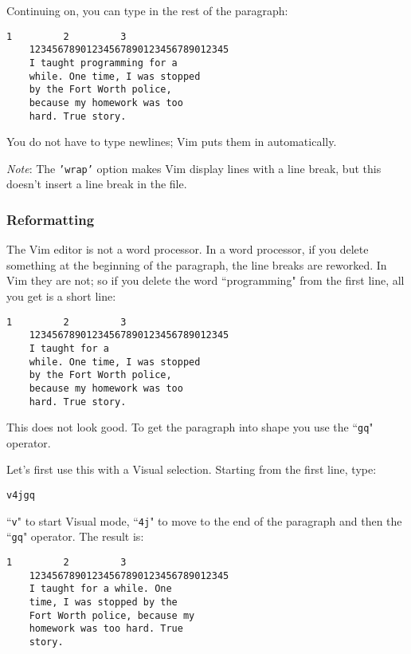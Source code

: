 Continuing on, you can type in the rest of the paragraph:

\begin{Verbatim}[samepage=true]
             1         2         3
    12345678901234567890123456789012345
    I taught programming for a
    while. One time, I was stopped
    by the Fort Worth police,
    because my homework was too
    hard. True story.
\end{Verbatim}

You do not have to type newlines; Vim puts them in automatically.

\emph{Note}: The \texttt{'wrap'} option makes Vim display lines with a line break, but this doesn't insert a line break in the file.
\subsubsection{Reformatting}
The Vim editor is not a word processor.
In a word processor, if you delete something at the beginning of the paragraph, the line breaks are reworked.
In Vim they are not; so if you delete the word ``programming" from the first line, all you get is a short line:

\begin{Verbatim}[samepage=true]
             1         2         3
    12345678901234567890123456789012345
    I taught for a
    while. One time, I was stopped
    by the Fort Worth police,
    because my homework was too
    hard. True story.
\end{Verbatim}

This does not look good.
To get the paragraph into shape you use the ``\texttt{gq}" operator.

Let's first use this with a Visual selection.
Starting from the first line, type:

\begin{Verbatim}[samepage=true]
 v4jgq
\end{Verbatim}

``\texttt{v}" to start Visual mode, ``\texttt{4j}" to move to the end of the paragraph and then the ``\texttt{gq}" operator.
The result is:

\begin{Verbatim}[samepage=true]
             1         2         3
    12345678901234567890123456789012345
    I taught for a while. One
    time, I was stopped by the
    Fort Worth police, because my
    homework was too hard. True
    story.
\end{Verbatim}

